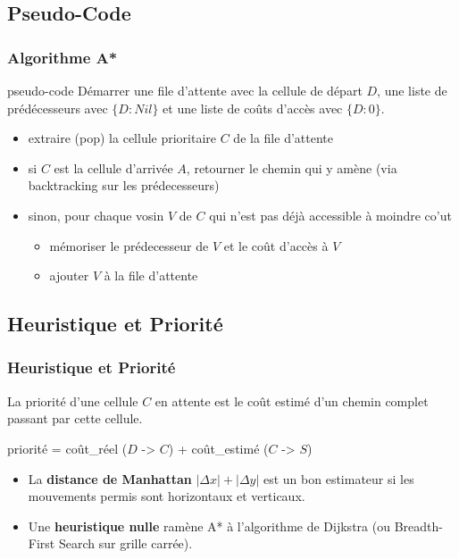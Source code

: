 \documentclass{beamer}
\begin{document}
\subsection{Pseudo-Code}
\begin{frame}
  \frametitle{Algorithme A*}
  \begin{block}{pseudo-code}
    Démarrer une file d'attente avec la cellule de départ $D$, une liste de
    prédécesseurs avec $\{D:Nil\}$ et une liste de coûts d'accès avec
    $\{D:0\}$.
    \medskip
    
    \begin{itemize}
    \item<3-> extraire (pop) la cellule prioritaire $C$ de la file d'attente
    \item<4-> si $C$ est la cellule d'arrivée $A$, retourner le chemin qui y amène
          (via backtracking sur les prédecesseurs)
    \item<5-> sinon, pour chaque vosin $V$ de $C$ qui n'est pas déjà accessible
      à moindre co'ut
      \begin{itemize}
      \item<6-> mémoriser le prédecesseur de $V$ et le coût d'accès à $V$
      \item<7-> ajouter $V$ à la file d'attente
      \end{itemize}
    \end{itemize}    
  \end{block}
\end{frame}

\subsection{Heuristique et Priorité}
\begin{frame}
  \frametitle{Heuristique et Priorité}
  La priorité d'une cellule $C$ en attente est le coût estimé d'un chemin
  complet passant par cette cellule.
  \smallskip

  priorité = coût_réel ($D$ -> $C$) + coût_estimé ($C$ -> $S$)

  \medskip
  \begin{itemize}
  \item<3->{La \textbf{distance de Manhattan} $|\Delta x| + |\Delta y|$
    est un bon estimateur si les mouvements permis sont horizontaux et verticaux.}
  \par
  \item<4>{Une \textbf{heuristique nulle} ramène A* à l'algorithme de Dijkstra
      (ou Breadth-First Search sur grille carrée).}
  \end{itemize}
\end{frame}
\end{document}
